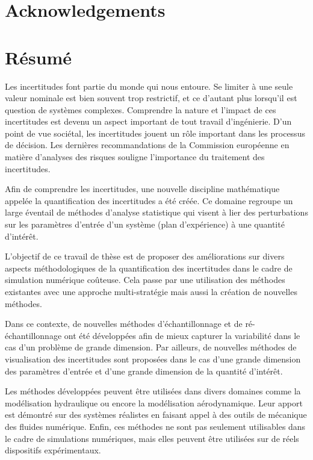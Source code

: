 
\cleardoublepage
\chapter*{Acknowledgements}


\newpage
{}
\chapter*{Résumé}

Les incertitudes font partie du monde qui nous entoure. Se limiter à une seule valeur nominale est bien souvent trop restrictif, et ce d'autant plus lorsqu'il est question de systèmes complexes. Comprendre la nature et l'impact de ces incertitudes est devenu un aspect important de tout travail d'ingénierie. D'un point de vue sociétal, les incertitudes jouent un rôle important dans les processus de décision. Les dernières recommandations de la Commission européenne en matière d'analyses des risques souligne l'importance du traitement des incertitudes.

Afin de comprendre les incertitudes, une nouvelle discipline mathématique appelée la quantification des incertitudes a été créée. Ce domaine regroupe un large éventail de méthodes d'analyse statistique qui visent à lier des perturbations sur les paramètres d'entrée d'un système (plan d'expérience) à une quantité d'intérêt.

L'objectif de ce travail de thèse est de proposer des améliorations sur divers aspects méthodologiques de la quantification des incertitudes dans le cadre de simulation numérique coûteuse. Cela passe par une utilisation des méthodes existantes avec une approche multi-stratégie mais aussi la création de nouvelles méthodes.

Dans ce contexte, de nouvelles méthodes d'échantillonnage et de ré-échantillonnage ont été développées afin de mieux capturer la variabilité dans le cas d'un problème de grande dimension. Par ailleurs, de nouvelles méthodes de visualisation des incertitudes sont proposées dans le cas d'une grande dimension des paramètres d'entrée et d'une grande dimension de la quantité d'intérêt.

Les méthodes développées peuvent être utilisées dans divers domaines comme la modélisation hydraulique ou encore la modélisation aérodynamique. Leur apport est démontré sur des systèmes réalistes en faisant appel à des outils de mécanique des fluides numérique. Enfin, ces méthodes ne sont pas seulement utilisables dans le cadre de simulations numériques, mais elles peuvent être utilisées sur de réels dispositifs expérimentaux.\\

